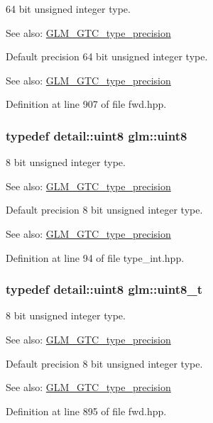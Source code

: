 64 bit unsigned integer type. \begin{Desc}
\item[See also:]\hyperlink{group__gtc__type__precision}{GLM\_\-GTC\_\-type\_\-precision}\end{Desc}
Default precision 64 bit unsigned integer type. \begin{Desc}
\item[See also:]\hyperlink{group__gtc__type__precision}{GLM\_\-GTC\_\-type\_\-precision} \end{Desc}


Definition at line 907 of file fwd.hpp.\hypertarget{group__gtc__type__precision_g1a7dcd8aac97cc8020817c94049deff2}{
\subsubsection[uint8]{\setlength{\rightskip}{0pt plus 5cm}typedef detail::uint8 {\bf glm::uint8}}}
\label{group__gtc__type__precision_g1a7dcd8aac97cc8020817c94049deff2}


8 bit unsigned integer type. \begin{Desc}
\item[See also:]\hyperlink{group__gtc__type__precision}{GLM\_\-GTC\_\-type\_\-precision}\end{Desc}
Default precision 8 bit unsigned integer type. \begin{Desc}
\item[See also:]\hyperlink{group__gtc__type__precision}{GLM\_\-GTC\_\-type\_\-precision} \end{Desc}


Definition at line 94 of file type\_\-int.hpp.\hypertarget{group__gtc__type__precision_g93adf6dd9803408f3e3aaf9dedda352b}{
\subsubsection[uint8\_\-t]{\setlength{\rightskip}{0pt plus 5cm}typedef detail::uint8 {\bf glm::uint8\_\-t}}}
\label{group__gtc__type__precision_g93adf6dd9803408f3e3aaf9dedda352b}


8 bit unsigned integer type. \begin{Desc}
\item[See also:]\hyperlink{group__gtc__type__precision}{GLM\_\-GTC\_\-type\_\-precision}\end{Desc}
Default precision 8 bit unsigned integer type. \begin{Desc}
\item[See also:]\hyperlink{group__gtc__type__precision}{GLM\_\-GTC\_\-type\_\-precision} \end{Desc}


Definition at line 895 of file fwd.hpp.
